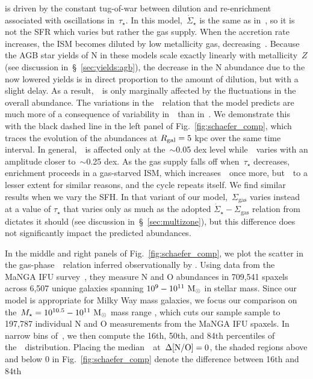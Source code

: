 \documentclass[ms.tex]{subfiles}
\begin{document}
is driven by the constant tug-of-war between dilution and re-enrichment
associated with oscillations in~$\tau_\star$.
In this model,~$\dot{\Sigma}_\star$ is the same as in~\citet{Johnson2021}, so
it is not the SFR which varies but rather the gas supply.
When the accretion rate increases, the ISM becomes diluted by low metallicity
gas, decreasing~\oh.
Because the AGB star yields of N in these models scale exactly linearly with
metallicity~$Z$ (see discussion in~\S~\ref{sec:yields:agb}), the decrease in
the N abundance due to the now lowered yields is in direct proportion to the
amount of dilution, but with a slight delay.
As a result,~\no~is only marginally affected by the fluctuations in the overall
abundance.
The variations in the~\ohno~relation that the model predicts are much more of a
consequence of variability in~\oh~than in~\no.
We demonstrate this with the black dashed line in the left panel of
Fig.~\ref{fig:schaefer_comp}, which traces the evolution of the abundances at
$R_\text{gal} = 5$ kpc over the same time interval.
In general,~\no~is affected only at the~$\sim$0.05 dex level while~\oh~varies
with an amplitude closer to~$\sim$0.25 dex.
As the gas supply falls off when~$\tau_\star$ decreases, enrichment proceeds
in a gas-starved ISM, which increases~\oh~once more, but~\no~to a lesser
extent for similar reasons, and the cycle repeats itself.
We find similar results when we vary the SFH.
In that variant of our model,~$\Sigma_\text{gas}$ varies instead at a value of
$\tau_\star$ that varies only as much as the adopted
$\dot{\Sigma}_\star - \Sigma_\text{gas}$ relation from~\citet{Johnson2021}
dictates it should (see discussion in~\S~\ref{sec:multizone}), but this
difference does not significantly impact the predicted abundances.
\par
In the middle and right panels of Fig.~\ref{fig:schaefer_comp}, we plot the
scatter in the gas-phase~\ohno~relation inferred observationally by
\citet{Schaefer2020}.
Using data from the MaNGA IFU survey~\citep{Bundy2015}, they measure N and O
abundances in 709,541 spaxels across 6,507 unique galaxies spanning
$10^9 - 10^{11}~\text{M}_\odot$ in stellar mass.
Since our model is appropriate for Milky Way mass galaxies, we focus our
comparison on the~$M_\star = 10^{10.5} - 10^{11}~\text{M}_\odot$ mass range
\citep{Licquia2015}, which cuts our sample sample to 197,787 individual N and O
measurements from the MaNGA IFU spaxels.
In narrow bins of~\oh, we then compute the 16th, 50th, and 84th percentiles of
the~\no~distribution.
Placing the median~\no~at~$\Delta\text{[N/O]} = 0$, the shaded regions above and below
0 in Fig.~\ref{fig:schaefer_comp} denote the difference between 16th and 84th
\end{document}
